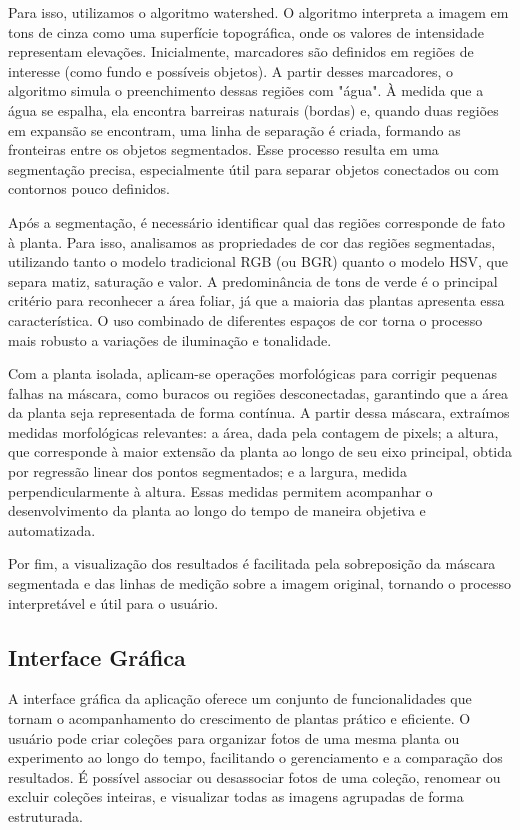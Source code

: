Para isso, utilizamos o algoritmo watershed. O algoritmo interpreta a imagem em tons de cinza como uma superfície topográfica, onde os valores de intensidade representam elevações. Inicialmente, marcadores são definidos em regiões de interesse (como fundo e possíveis objetos). A partir desses marcadores, o algoritmo simula o preenchimento dessas regiões com "água". À medida que a água se espalha, ela encontra barreiras naturais (bordas) e, quando duas regiões em expansão se encontram, uma linha de separação é criada, formando as fronteiras entre os objetos segmentados. Esse processo resulta em uma segmentação precisa, especialmente útil para separar objetos conectados ou com contornos pouco definidos.

Após a segmentação, é necessário identificar qual das regiões corresponde de fato à planta. Para isso, analisamos as propriedades de cor das regiões segmentadas, utilizando tanto o modelo tradicional RGB (ou BGR) quanto o modelo HSV, que separa matiz, saturação e valor. A predominância de tons de verde é o principal critério para reconhecer a área foliar, já que a maioria das plantas apresenta essa característica. O uso combinado de diferentes espaços de cor torna o processo mais robusto a variações de iluminação e tonalidade.

Com a planta isolada, aplicam-se operações morfológicas para corrigir pequenas falhas na máscara, como buracos ou regiões desconectadas, garantindo que a área da planta seja representada de forma contínua. A partir dessa máscara, extraímos medidas morfológicas relevantes: a área, dada pela contagem de pixels; a altura, que corresponde à maior extensão da planta ao longo de seu eixo principal, obtida por regressão linear dos pontos segmentados; e a largura, medida perpendicularmente à altura. Essas medidas permitem acompanhar o desenvolvimento da planta ao longo do tempo de maneira objetiva e automatizada.

Por fim, a visualização dos resultados é facilitada pela sobreposição da máscara segmentada e das linhas de medição sobre a imagem original, tornando o processo interpretável e útil para o usuário.

\subsection{Interface Gráfica}

A interface gráfica da aplicação oferece um conjunto de funcionalidades que tornam o acompanhamento do crescimento de plantas prático e eficiente. O usuário pode criar coleções para organizar fotos de uma mesma planta ou experimento ao longo do tempo, facilitando o gerenciamento e a comparação dos resultados. É possível associar ou desassociar fotos de uma coleção, renomear ou excluir coleções inteiras, e visualizar todas as imagens agrupadas de forma estruturada.

